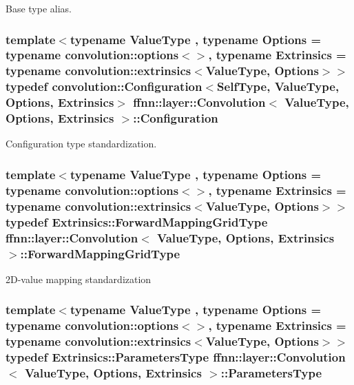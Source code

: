 Base type alias. 

\hypertarget{classffnn_1_1layer_1_1_convolution_a01dee52138bb0d51a1ecddb5504176be}{
\subsubsection[{Configuration}]{\setlength{\rightskip}{0pt plus 5cm}template$<$typename Value\-Type , typename Options  = typename convolution\-::options$<$$>$, typename Extrinsics  = typename convolution\-::extrinsics$<$\-Value\-Type, Options$>$$>$ typedef {\bf convolution\-::\-Configuration}$<${\bf Self\-Type}, Value\-Type, Options, Extrinsics$>$ {\bf ffnn\-::layer\-::\-Convolution}$<$ Value\-Type, Options, Extrinsics $>$\-::{\bf Configuration}}}\label{classffnn_1_1layer_1_1_convolution_a01dee52138bb0d51a1ecddb5504176be}


Configuration type standardization. 

\hypertarget{classffnn_1_1layer_1_1_convolution_a2b15b4e46b7679753e4f3e28b619bae5}{
\subsubsection[{Forward\-Mapping\-Grid\-Type}]{\setlength{\rightskip}{0pt plus 5cm}template$<$typename Value\-Type , typename Options  = typename convolution\-::options$<$$>$, typename Extrinsics  = typename convolution\-::extrinsics$<$\-Value\-Type, Options$>$$>$ typedef Extrinsics\-::\-Forward\-Mapping\-Grid\-Type {\bf ffnn\-::layer\-::\-Convolution}$<$ Value\-Type, Options, Extrinsics $>$\-::{\bf Forward\-Mapping\-Grid\-Type}}}\label{classffnn_1_1layer_1_1_convolution_a2b15b4e46b7679753e4f3e28b619bae5}


2\-D-\/value mapping standardization 

\hypertarget{classffnn_1_1layer_1_1_convolution_af2568040fc4089f93a6483da08dcc266}{
\subsubsection[{Parameters\-Type}]{\setlength{\rightskip}{0pt plus 5cm}template$<$typename Value\-Type , typename Options  = typename convolution\-::options$<$$>$, typename Extrinsics  = typename convolution\-::extrinsics$<$\-Value\-Type, Options$>$$>$ typedef Extrinsics\-::\-Parameters\-Type {\bf ffnn\-::layer\-::\-Convolution}$<$ Value\-Type, Options, Extrinsics $>$\-::{\bf Parameters\-Type}}}\label{classffnn_1_1layer_1_1_convolution_af2568040fc4089f93a6483da08dcc266}


